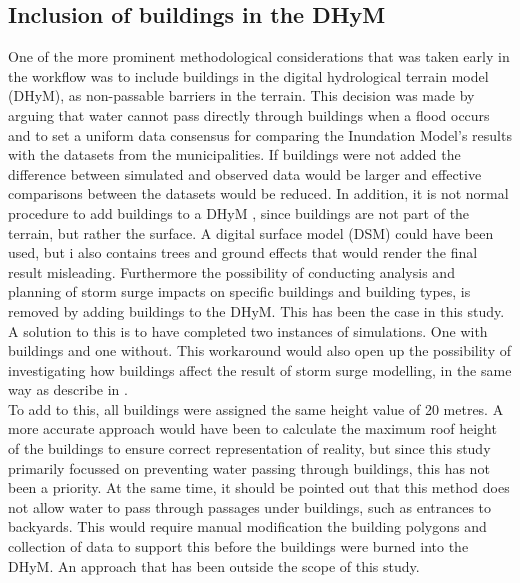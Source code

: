 \subsection{Inclusion of buildings in the DHyM}
One of the more prominent methodological considerations that was taken early in the workflow was to include buildings in the digital hydrological terrain model (DHyM), as non-passable barriers in the terrain. This decision was made by arguing that water cannot pass directly through buildings when a flood occurs and to set a uniform data consensus for comparing the Inundation Model's results with the datasets from the municipalities. If buildings were not added the difference between simulated and observed data would be larger and effective comparisons between the datasets would be reduced.
In addition, it is not normal procedure to add buildings to a DHyM \citep{khosh_bin_ghomash_technical_2024}, since buildings are not part of the terrain, but rather the surface. A digital surface model (DSM) could have been used, but i also contains trees and ground effects that would render the final result misleading. Furthermore the possibility of conducting analysis and planning of storm surge impacts on specific buildings and building types, is removed by adding buildings to the DHyM. This has been the case in this study. A solution to this is to have completed two instances of simulations. One with buildings and one without. This workaround would also open up the possibility of investigating how buildings affect the result of storm surge modelling, in the same way as describe in \cite{khosh_bin_ghomash_technical_2024}.\\

To add to this, all buildings were assigned the same height value of 20 metres. A more accurate approach would have been to calculate the maximum roof height of the buildings to ensure correct representation of reality, but since this study primarily focussed on preventing water passing through buildings, this has not been a priority. At the same time, it should be pointed out that this method does not allow water to pass through passages under buildings, such as entrances to backyards. This would require manual modification the building polygons and collection of data to support this before the buildings were burned into the DHyM. An approach that has been outside the scope of this study.